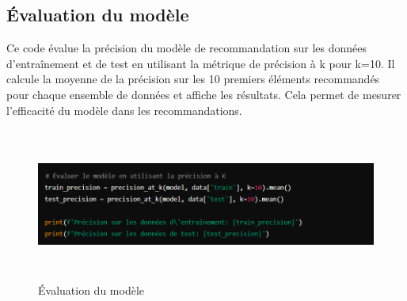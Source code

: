 \documentclass[edit,12pt,a4paper,ChapStyle,oneside,doubleinterligne]{report}
\begin{document}
\subsection{Évaluation du modèle}
Ce code évalue la précision du modèle de recommandation sur les données d'entraînement et de test en utilisant la métrique de précision à k pour k=10. Il calcule la moyenne de la précision sur les 10 premiers éléments recommandés pour chaque ensemble de données et affiche les résultats. Cela permet de mesurer l'efficacité du modèle dans les recommandations.
\begin{figure} [H]
    \centering
    \includegraphics[width=15.742708333cm , height = 5cm , angle=360]{images/Évaluation du modèle.png}
    \caption{Évaluation du modèle}
    \label{fig:Évaluation du modèle}
\end{figure}
\end{document}
